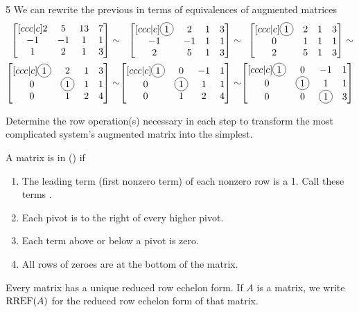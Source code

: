 \begin{activity}{5}
We can rewrite the previous in terms of  equivalences of augmented matrices
\[
	\begin{alignedat}{3}
		\begin{bmatrix}[ccc|c] 2 & 5 & 1 3 & 7 \\ -1 & -1 & 1 & 1 \\ 1 & 2 & 1 & 3 \end{bmatrix} & \sim &
		\begin{bmatrix}[ccc|c] \circledNumber{1} & 2 & 1 & 3 \\ -1 & -1 & 1 & 1 \\ 2 & 5 & 1 & 3  \end{bmatrix} & \sim &
		\begin{bmatrix}[ccc|c] \circledNumber{1} & 2 & 1 & 3 \\ 0 & 1 & 1 & 1 \\ 2 & 5 & 1 & 3  \end{bmatrix} \sim  \\
		\begin{bmatrix}[ccc|c] \circledNumber{1} & 2 & 1 & 3 \\ 0 & \circledNumber{1} & 1 & 1 \\ 0 & 1 & 2 & 4  \end{bmatrix} & \sim &
		\begin{bmatrix}[ccc|c] \circledNumber{1} & 0 & -1 & 1 \\ 0 & \circledNumber{1} & 1 & 1 \\ 0 & 1 & 2 & 4  \end{bmatrix} & \sim &
		\begin{bmatrix}[ccc|c] \circledNumber{1} & 0 & -1 & 1 \\ 0 & \circledNumber{1} & 1 & 1 \\ 0 & 0 & \circledNumber{1} & 3  \end{bmatrix} 
 	\end{alignedat}
\]

		Determine the row operation(s) necessary in each step to transform the most complicated
    system's augmented matrix into the simplest.

\end{activity}

\begin{definition}
A matrix is in  () if
\begin{enumerate}
\item The leading term (first nonzero term) of each nonzero row is a 1.
      Call these terms .
\item Each pivot is to the right of every higher pivot.
\item Each term above or below a pivot is zero.
\item All rows of zeroes are at the bottom of the matrix.
\end{enumerate}
\vfill
Every matrix has a unique reduced row echelon form. If \(A\) is a matrix, we write \(\operatorname{RREF}(A)\) for the reduced row echelon form of that matrix.
\end{definition}

